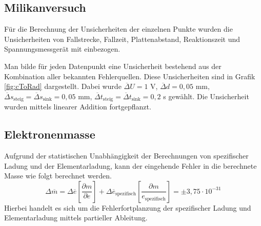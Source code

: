 \documentclass[a4paper,usenatbib]{aspdoc}
\begin{document}
        \subsection{Milikanversuch}
            Für die Berechnung der Unsicherheiten der einzelnen Punkte wurden die Unsicherheiten von Fallstrecke, Fallzeit, Plattenabstand, Reaktionszeit und Spannungsmessgerät mit einbezogen.
            
            \noindent Man bilde für jeden Datenpunkt eine Unsicherheit bestehend aus der Kombination aller bekannten Fehlerquellen. Diese Unsicherheiten sind in Grafik \ref{fig:cToRad} dargestellt. Dabei wurde $\overline{\Delta} U = 1$ V, $\overline{\Delta} d = 0,05$ mm, $\overline{\Delta} s_{\mathrm{steig}} = \overline{\Delta} s_{\mathrm{sink}} = 0,05$ mm, $\overline{\Delta} t_{\mathrm{steig}} = \overline{\Delta} t_{\mathrm{sink}} = 0,2$ s gewählt. Die Unsicherheit wurden mittels linearer Addition fortgepflanzt\footnotemark[1].
                
            
        \subsection{Elektronenmasse}
            Aufgrund der statistischen Unabhängigkeit der Berechnungen von spezifischer Ladung und der Elementarladung, kann der eingehende Fehler in die berechnete Masse wie folgt berechnet werden.
            \begin{equation}
                \Delta \overline{m} = \Delta \overline{e} \left[\frac{\partial m}{\partial e}\right] + \Delta \overline{e}_{\mathrm{spezifisch}} \left[\frac{\partial m}{e_{\mathrm{spezifisch}}}\right]  = \pm 3,75 \cdot 10^{-31}
            \end{equation}
            Hierbei handelt es sich um die Fehlerfortplanzung der spezifischer Ladung und Elementarladung mittels partieller Ableitung.
    
    \label{lastpage}
\end{document}
